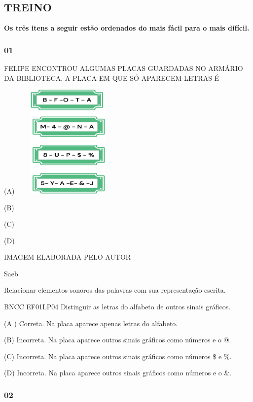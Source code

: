 \subsection{TREINO}\label{treino}

\textbf{Os três itens a seguir estão ordenados do mais fácil para o mais
difícil. }

\subsubsection{01}\label{section}

FELIPE ENCONTROU ALGUMAS PLACAS GUARDADAS NO ARMÁRIO DA BIBLIOTECA. A
PLACA EM QUE SÓ APARECEM LETRAS É

(A)
\includegraphics[width=2.16042in,height=2.19514in]{media/image82.png}

(B)

(C)

(D)

IMAGEM ELABORADA PELO AUTOR

Saeb

Relacionar elementos sonoros das palavras com sua representação escrita.

BNCC EF01LP04 Distinguir as letras do alfabeto de outros sinais
gráficos.

(A ) Correta. Na placa aparece apenas letras do alfabeto.

(B) Incorreta. Na placa aparece outros sinais gráficos como números e o
@.

(C) Incorreta. Na placa aparece outros sinais gráficos como números \$ e
\%.

(D) Incorreta. Na placa aparece outros sinais gráficos como números e o
\&.

\protect\hypertarget{_heading=h.n783suxaxbxa}{}{}

\protect\hypertarget{_heading=h.pxfg7nlkhght}{}{}

\subsubsection{02}\label{section-1}

